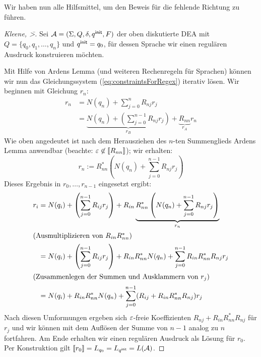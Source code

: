 
\medskip

Wir haben nun alle Hilfsmittel, um den Beweis für die fehlende Richtung zu führen.

\begin{proof}[Kleene, \=>]
  Sei $\mathcal{A}=(\Sigma,{Q},\delta,q^\mathsf{init},F)$ der oben diskutierte \acs*{DEA} mit $Q = \{q_0,q_1,\dots,q_n\}$ und $q^\mathsf{init}=q_0$, für dessen Sprache wir einen regulären Ausdruck konstruieren möchten.
  
  Mit Hilfe von Ardens Lemma (und weiteren Rechenregeln für Sprachen) können wir nun das Gleichungssystem (\ref{eq:constraintsForRegex}) iterativ lösen.
    Wir beginnen mit Gleichung $r_n$:
    \begin{align*}
      r_n &= N(q_n) + \sum_{j = 0}^n R_{nj} r_j \\
          &= \underbrace{N(q_n) + \left (\sum_{j = 0}^{n-1} R_{nj} r_j \right)}_{r_B} + \underbrace{R_{nn}}_{r_A} r_n
    \end{align*}
    Wie oben angedeutet ist nach dem Herausziehen des $n$-ten Summenglieds Ardens Lemma anwendbar (beachte: $\varepsilon \not \in [\![ R_{nn} ]\!]$); wir erhalten:
    \begin{displaymath}
      r_n := R_{nn}^*\left(N(q_n) + \sum_{j = 0}^{n-1} R_{nj} r_j  \right)
    \end{displaymath}
    Dieses Ergebnis in $r_0,\ldots,r_{n-1}$ eingesetzt ergibt:
    \begin{align*}
      r_i &= N(q_i) + \left (\sum_{j = 0}^{n-1} R_{ij} r_j \right) + R_{in} \underbrace{R_{nn}^*\left(N(q_n) + \sum_{j = 0}^{n-1} R_{nj} r_j  \right)}_{r_n} \\
      \intertext{(Ausmultiplizieren von $R_{in}R_{nn}^*$)}
          &= N(q_i) + \left (\sum_{j = 0}^{n-1} R_{ij} r_j \right) + R_{in}R_{nn}^*N(q_n) + \sum_{j = 0}^{n-1} R_{in}R_{nn}^*R_{nj} r_j  \\
      \intertext{(Zusammenlegen der Summen und Ausklammern von $r_j$)}
          &= N(q_i) + R_{in}R_{nn}^*N(q_n) + \sum_{j = 0}^{n-1} (R_{ij} + R_{in}R_{nn}^*R_{nj}) r_j
    \end{align*}
  Nach diesen Umformungen ergeben sich $\varepsilon$-freie Koeffizienten $R_{nj} + R_{in}R_{nn}^*R_{nj}$ für $r_j$ und wir können mit dem Auflösen der Summe von $n-1$ analog zu $n$ fortfahren.
  Am Ende erhalten wir einen regulären Ausdruck als Lösung für $r_0$.
  Per Konstruktion gilt $[\![ r_0 ]\!] = L_{q_0} = L_{q^\mathsf{init}} = L(\mathcal{A})$.
  \end{proof}
    

